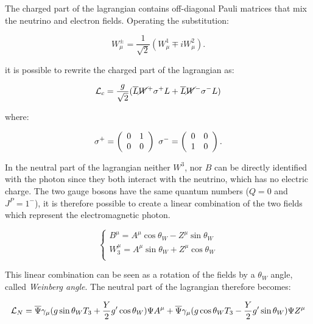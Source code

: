 The charged part of the lagrangian contains off-diagonal Pauli matrices that mix the neutrino and electron fields. Operating the substitution:

\begin{equation}
W^\pm_\mu = \frac{1}{\sqrt{2}}(W^{1}_{\mu} \mp i W^{2}_{\mu}).
\label{eq:wpm_def}
\end{equation}

it is possible to rewrite the charged part of the lagrangian as:

\begin{equation}
\mathcal{L}_c = \frac{g}{\sqrt{2}}(\overline{L}\cancel{W}^{+} \sigma^{+} L +\overline{L}\cancel{W}^{-}\sigma^{-} L)
\end{equation}

where:

\begin{equation}
\sigma^+ = \left(\begin{array}{cc}0 & 1 \\0 & 0\end{array}\right)\,\, \sigma^- = \left(\begin{array}{cc}0 & 0 \\1 & 0\end{array}\right).
\end{equation}

In the neutral part of the lagrangian neither $W^3$, nor $B$ can be directly identified with the photon since they both interact with the neutrino, which has no electric charge. The two gauge bosons have the same quantum numbers ($Q = 0$ and $J^P = 1^-$), it is therefore possible to create a linear combination of the two fields which represent the electromagnetic photon.

\begin{equation}
\left\{\begin{matrix}
B^{\mu}=A^{\mu}\operatorname{cos}\theta_{W}-Z^{\mu}\operatorname{sin}\theta_{W}\\ 

W^{\mu}_3=A^{\mu}\operatorname{sin}\theta_{W}+Z^{\mu}\cos\theta_{W}\\ 
\end{matrix}\right.
\label{eq:su2_rotation}
\end{equation}

This linear combination can be seen as a rotation of the fields by a $\theta_W$ angle, called \emph{Weinberg angle}. 
The neutral part of the lagrangian therefore becomes:
 
\begin{equation}
\mathcal{L}_{N}=\overline{\Psi}\gamma_{\mu}(g\operatorname{sin}\theta_{W}T_3+ \frac{Y}{2}g'\operatorname{cos}\theta_{W})\Psi A^{\mu}+\overline{\Psi}\gamma_{\mu}(g\operatorname{cos}\theta_{W}T_3- \frac{Y}{2}g'\operatorname{sin}\theta_{W})\Psi Z^{\mu}
\end{equation}

